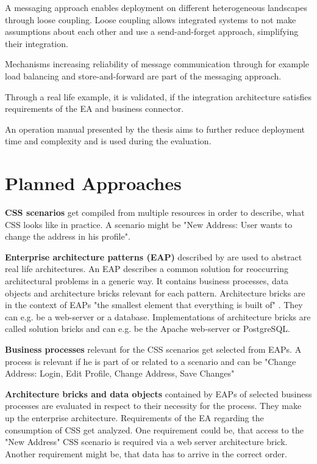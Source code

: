 \documentclass{article}
\begin{document}
A messaging approach enables deployment on different heterogeneous landscapes through 
loose coupling. Loose coupling allows integrated systems to not make assumptions about each other and use a 
send-and-forget approach, simplifying their integration.

Mechanisms increasing reliability of message communication through for example load balancing and store-and-forward are part of the 
messaging approach.

Through a real life example, it is validated, if the integration architecture satisfies requirements of the EA and 
business connector.

An operation manual presented by the thesis aims to further reduce deployment time and complexity and is used during the evaluation.

\section{Planned Approaches}

\textbf{CSS scenarios} get compiled from multiple resources in order to describe, what CSS looks like in practice.
A scenario might be "New Address: User wants to change the address in his profile".

\textbf{Enterprise architecture patterns (EAP)} described by \textcite{architecturePatterns} are used to abstract
real life architectures. An EAP describes a common solution for reoccurring architectural problems in a 
generic way. It contains business processes, data objects and architecture bricks relevant for each pattern.
Architecture bricks are in the context of EAPs "the smallest element that everything is built of" 
\cite[Page 21]{architecturePatterns}. They can e.g. be a web-server or a database. Implementations of 
architecture bricks are called solution bricks and can e.g. be the Apache web-server or PostgreSQL.

\textbf{Business processes} relevant for the CSS scenarios get selected from EAPs. A process is relevant if he
is part of or related to a scenario and can be "Change Address: Login, Edit Profile, Change Address, Save Changes"

\textbf{Architecture bricks and data objects} contained by EAPs of selected business processes are evaluated in respect to their necessity 
for the process. They make up the enterprise architecture. Requirements of the EA 
regarding the consumption of CSS get analyzed. One requirement could be, that access to 
the "New Address" CSS scenario is required via a web server architecture brick. Another requirement might be, 
that data has to arrive in the correct order.
\end{document}
